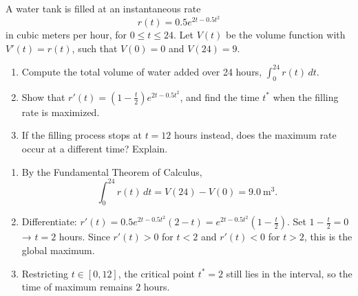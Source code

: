 \documentclass[11pt]{exam}
\begin{document}
\begin{questions}
\question[3]
A water tank is filled at an instantaneous rate
\[r(t)=0.5e^{2t-0.5t^2}\]
in cubic meters per hour, for \(0\le t\le24\).  Let \(V(t)\) be the volume function with \(V'(t)=r(t)\), such that 
\(V(0)=0\) and \(V(24)=9\).
\begin{enumerate}[label=(\alph*)]
  \item Compute the total volume of water added over 24 hours, \(\int_0^{24}r(t)\,dt\).
  \item Show that \(r'(t)=(1-\tfrac t2)e^{2t-0.5t^2}\), and find the time \(t^*\) when the filling rate is maximized.
  \item If the filling process stops at \(t=12\) hours instead, does the maximum rate occur at a different time? Explain.
\end{enumerate}

\begin{solution}
\begin{enumerate}[label=(\alph*)]
  \item By the Fundamental Theorem of Calculus,
  \[
    \int_0^{24}r(t)\,dt = V(24)-V(0) = 9.0\ \text{m}^3.
  \]
  \item Differentiate:
  \(
    r'(t)=0.5e^{2t-0.5t^2}(2 - t)=e^{2t-0.5t^2}(1 - \tfrac t2).
  \)
  Set \(1-\tfrac t2=0\) → \(t=2\) hours.  Since \(r'(t)>0\) for \(t<2\) and \(r'(t)<0\) for \(t>2\), this is the global maximum.
  \item Restricting \(t\in[0,12]\), the critical point \(t^*=2\) still lies in the interval, so the time of maximum remains \(2\) hours.
\end{enumerate}
\end{solution}

\end{questions}
\end{document}
